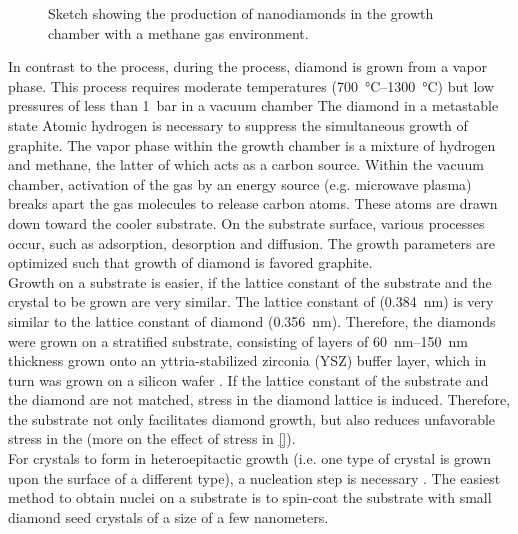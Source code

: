 	\begin{figure}[tp]
		\centering
		\caption{Sketch showing the production of \CVD nanodiamonds in the growth chamber with a methane gas environment.}
		\label{fig::cvd_sketch}
	\end{figure}

	In contrast to the \HPHT process,  during the \cvd process, diamond is grown from a vapor phase.
	This process requires moderate temperatures (\SIrange{700}{1300}{\celsius}) but low pressures of less than \SI{1}{\bar} in a vacuum chamber \cite{}
	The diamond in a metastable state 
	Atomic hydrogen is necessary to suppress the simultaneous growth of graphite.
	The vapor phase within the growth chamber is a mixture of hydrogen and methane, the latter of which acts as a carbon source.
	Within the vacuum chamber, activation of the gas by an energy source (e.g. microwave plasma) breaks apart the gas molecules to release carbon atoms. 
	These atoms are drawn down toward the cooler substrate.
	On the substrate surface, various processes occur, such as adsorption, desorption and diffusion.
	The growth parameters are optimized such that growth of diamond is favored \wrt graphite.
	\\
	Growth on a substrate is easier, if the lattice constant of the substrate and the crystal to be grown are very similar.
	The lattice constant of \ir (\SI{0.384}{nm}\cite{Arblaster2010,Gsell2007}) is very similar to the lattice constant of diamond (\SI{0.356}{nm}\cite{Davis1993}).
	Therefore, the diamonds were grown on a stratified substrate, consisting of \ir layers of \SIrange{60}{150}{nm} thickness grown onto an yttria-stabilized zirconia (YSZ) buffer layer, which in turn was grown on a silicon wafer \cite{Gsell2004a}.
	If the lattice constant of the substrate and the diamond are not matched, stress in the diamond lattice is induced.
	Therefore, the \ir substrate not only facilitates diamond growth, but also reduces unfavorable stress in the \nds (more on the effect of stress in \autoref{}).
	\\
	For crystals to form in heteroepitactic growth (i.e. one type of crystal is grown upon the surface of a different type), a nucleation step is necessary \cite{Schreck2014a}.
	The easiest method to obtain nuclei on a substrate is to spin-coat the substrate with small diamond seed crystals of a size of a few nanometers. 
